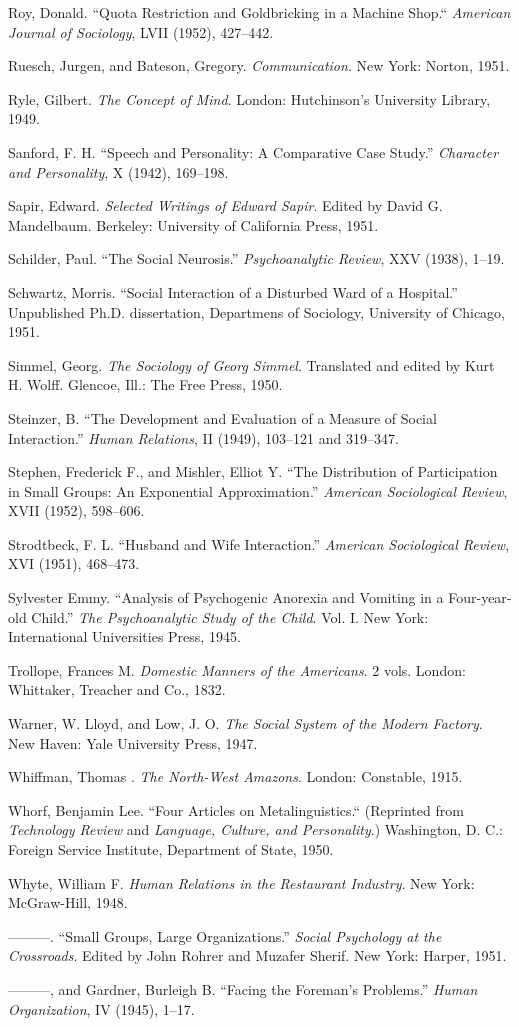 \documentclass[twoside,symmetric,nobib,justified]{tufte-book}
\begin{document}
\begin{hangparas}{.25in}{1}
Roy, Donald. ``Quota Restriction and Goldbricking in a Machine Shop.``
\emph{American Journal of Sociology}, LVII (1952), 427--442.

Ruesch, Jurgen, and Bateson, Gregory. \emph{Communication}. New York:
Norton, 1951.

Ryle, Gilbert. \emph{The Concept of Mind}. London: Hutchinson's
University Library, 1949.

Sanford, F. H. ``Speech and Personality: A Comparative Case Study.''
\emph{Character and Personality}, X (1942), 169--198.

Sapir, Edward. \emph{Selected Writings of Edward Sapir}. Edited by David
G. Mandelbaum. Berkeley: University of California Press, 1951.

Schilder, Paul. ``The Social Neurosis.'' \emph{Psychoanalytic Review},
XXV (1938), 1--19.

Schwartz, Morris. ``Social Interaction of a Disturbed Ward of a
Hospital.'' Unpublished Ph.D. dissertation, Departmens of Sociology,
University of Chicago, 1951.

Simmel, Georg. \emph{The Sociology of Georg Simmel}. Translated and
edited by Kurt H. Wolff. Glencoe, Ill.: The Free Press, 1950.

Steinzer, B. ``The Development and Evaluation of a Measure of Social
Interaction.'' \emph{Human Relations}, II (1949), 103--121 and 319--347.

Stephen, Frederick F., and Mishler, Elliot Y. ``The Distribution of
Participation in Small Groups: An Exponential Approximation.''
\emph{American Sociological Review}, XVII (1952), 598--606.

Strodtbeck, F. L. ``Husband and Wife Interaction.'' \emph{American
Sociological Review}, XVI (1951), 468--473.

Sylvester Emmy. ``Analysis of Psychogenic Anorexia and Vomiting in a
Four-year-old Child.'' \emph{The Psychoanalytic Study of the Child}.
Vol. I. New York: International Universities Press, 1945.

Trollope, Frances M. \emph{Domestic Manners of the Americans}. 2 vols.
London: Whittaker, Treacher and Co., 1832.

Warner, W. Lloyd, and Low, J. O. \emph{The Social System of the Modern
Factory}. New Haven: Yale University Press, 1947.

Whiffman, Thomas . \emph{The North-West Amazons}. London: Constable,
1915.

Whorf, Benjamin Lee. ``Four Articles on Metalinguistics.`` (Reprinted
from \emph{Technology Review} and \emph{Language, Culture, and
Personality}.) Washington, D. C.: Foreign Service Institute, Department
of State, 1950.

Whyte, William F. \emph{Human Relations in the Restaurant Industry}. New
York: McGraw-Hill, 1948.

---------. ``Small Groups, Large Organizations.'' \emph{Social
Psychology at the Crossroads}. Edited by John Rohrer and Muzafer Sherif.
New York: Harper, 1951.

---------, and Gardner, Burleigh B. ``Facing the Foreman's Problems.''
\emph{Human Organization}, IV (1945), 1--17.



\end{hangparas}
\end{document}
